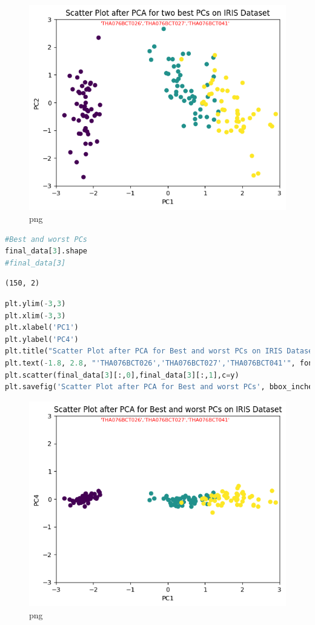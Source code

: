 \documentclass[
]{article}
\begin{document}
\begin{figure}
\centering
\includegraphics{PCA on IRIS_files/PCA on IRIS_48_0.png}
\caption{png}
\end{figure}

\begin{lstlisting}[language=Python]
#Best and worst PCs
final_data[3].shape
#final_data[3]
\end{lstlisting}

\begin{lstlisting}
(150, 2)
\end{lstlisting}

\begin{lstlisting}[language=Python]
plt.ylim(-3,3)
plt.xlim(-3,3)
plt.xlabel('PC1')
plt.ylabel('PC4')
plt.title("Scatter Plot after PCA for Best and worst PCs on IRIS Dataset")
plt.text(-1.8, 2.8, "'THA076BCT026','THA076BCT027','THA076BCT041'", fontsize=8,color='red')
plt.scatter(final_data[3][:,0],final_data[3][:,1],c=y)
plt.savefig('Scatter Plot after PCA for Best and worst PCs', bbox_inches='tight')
\end{lstlisting}

\begin{figure}
\centering
\includegraphics{PCA on IRIS_files/PCA on IRIS_50_0.png}
\caption{png}
\end{figure}
\end{document}
